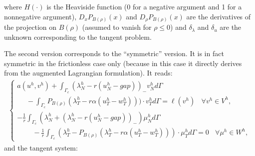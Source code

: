 \documentclass[a4paper,11pt,english]{sphinxmanual}
\begin{document}
where \(H(\cdot)\) is the Heaviside function (0 for a negative argument and 1 for a non\sphinxhyphen{}negative argument), \(D_xP_{B(\rho)}(x)\) and \(D_{\rho}P_{B(\rho)}(x)\) are the derivatives of the projection on \(B(\rho)\) (assumed to vanish for \(\rho \le 0\)) and \(\delta_{\lambda}\) and \(\delta_{u}\) are the unknown corresponding to the tangent problem.

The second version corresponds to the “symmetric” version. It is in fact symmetric in the frictionless case only (because in this case it directly derives from the augmented Lagrangian formulation). It reads:
\begin{equation*}
\begin{split}\left\{\begin{array}{l}
a(u^h, v^h) + \displaystyle \int_{\Gamma_c} (\lambda^h_N - r(u^h_N-gap))_- v^h_N d\Gamma \\
~~~~~~ - \displaystyle \int_{\Gamma_c} P_{B(\rho)}(\lambda^h_T - r\alpha(u^h_T-w^h_T)))\cdot v^h_T d\Gamma = \ell(v^h) ~~~~ \forall v^h \in V^h, \\
\displaystyle -\frac{1}{r}\int_{\Gamma_c} (\lambda^h_N + (\lambda^h_N - r(u^h_N-gap))_-)\mu^h_N d\Gamma \\
~~~~~~~~~~\displaystyle -\frac{1}{r}\int_{\Gamma_c} (\lambda^h_T -P_{B(\rho)}(\lambda^h_T - r\alpha(u^h_T-w^h_T)))\cdot \mu^h_T d\Gamma = 0 ~~~~ \forall \mu^h \in W^h,
\end{array}\right.\end{split}
\end{equation*}
and the tangent system:
\end{document}
